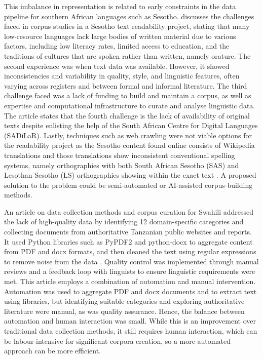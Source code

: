 \documentclass[11pt,a4paper]{article}
\begin{document}
This imbalance in representation is related to early constraints in the data pipeline for southern African languages such as Sesotho. \citet{Sibeko2024} discusses the challenges faced in corpus studies in a Sesotho text readability project, stating that many low-resource languages lack large bodies of written material due to various factors, including low literacy rates, limited access to education, and the traditions of cultures that are spoken rather than written, namely orature. The second experience was when text data was available. However, it showed inconsistencies and variability in quality, style, and linguistic features, often varying across registers and between formal and informal literature. The third challenge faced was a lack of funding to build and maintain a corpus, as well as expertise and computational infrastructure to curate and analyse linguistic data. The article states that the fourth challenge is the lack of availability of original texts despite enlisting the help of the South African Centre for Digital Languages (SADiLaR). Lastly, techniques such as web crawling were not viable options for the readability project as the Sesotho content found online consists of Wikipedia translations and those translations show inconsistent conventional spelling systems, namely orthographies with both South African Sesotho (SAS) and Lesothan Sesotho (LS) orthographies showing within the exact text \citep{Sibeko2024}. A proposed solution to the problem could be semi-automated or AI-assisted corpus-building methods.

\vspace{2em}
An article on data collection methods and corpus curation for Swahili addressed the lack of high-quality data by identifying 12 domain-specific categories and collecting documents from authoritative Tanzanian public websites and reports. It used Python libraries such as PyPDF2 and python-docx to aggregate content from PDF and docx formats, and then cleaned the text using regular expressions to remove noise from the data \citep{Masua2024}. Quality control was implemented through manual reviews and a feedback loop with linguists to ensure linguistic requirements were met. This article employs a combination of automation and manual intervention. Automation was used to aggregate PDF and docx documents and to extract text using libraries, but identifying suitable categories and exploring authoritative literature were manual, as was quality assurance. Hence, the balance between automation and human interaction was small. While this is an improvement over traditional data collection methods, it still requires human interaction, which can be labour-intensive for significant corpora creation, so a more automated approach can be more efficient.
\end{document}
